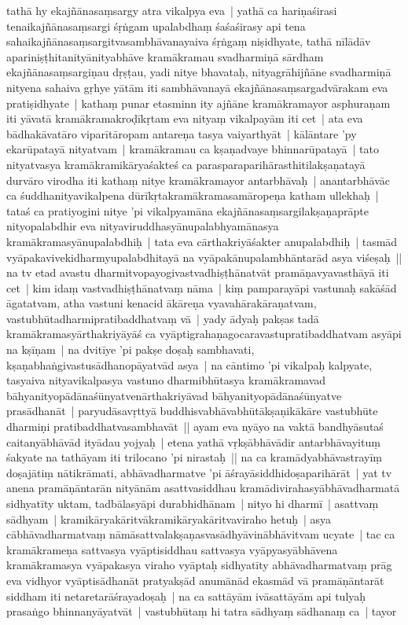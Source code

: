 \documentclass[article,12pt,a4paper]{memoir}%
\newcommand{\persName}[1]{#1}
\begin{document}
	  
	  \pstart \leavevmode%
	\label{thakur75-92.10}tathā hy ekajñānasaṃsargy atra vikalpya eva | yathā ca hariṇaśirasi tenaikajñānasaṃsargi śṛṅgam upalabdhaṃ śaśaśirasy api tena sahaikajñānasaṃsargitvasambhāvanayaiva śṛṅgaṃ niṣidhyate, tathā nīlādāv apariniṣṭhitanityānityabhāve kramākramau svadharmiṇā sārdham ekajñānasaṃsargiṇau dṛṣṭau, yadi nitye bhavataḥ, nityagrāhijñāne svadharmiṇā nityena sahaiva gṛhye yātām iti sambhāvanayā ekajñānasaṃsargadvārakam eva pratiṣidhyate | kathaṃ punar etasminn ity ajñāne kramākramayor asphuraṇam iti yāvatā kramākramakroḍīkṛtam eva nityaṃ vikalpayām iti cet | ata eva bādhakāvatāro viparītāropam antareṇa tasya vaiyarthyāt | \label{thakur75-92.17} kālāntare 'py ekarūpatayā nityatvam | kramākramau ca kṣaṇadvaye bhinnarūpatayā | tato nityatvasya kramākramikāryaśakteś ca parasparaparihārasthitilakṣaṇatayā durvāro virodha iti kathaṃ nitye kramākramayor antarbhāvaḥ | anantarbhāvāc ca śuddhanityavikalpena dūrīkṛtakramākramasamāropeṇa katham ullekhaḥ | tataś ca pratiyogini nitye 'pi vikalpyamāna ekajñānasaṃsargilakṣaṇaprāpte nityopalabdhir eva nityaviruddhasyānupalabhyamānasya kramākramasyānupalabdhiḥ | tata eva cārthakriyāśakter anupalabdhiḥ | tasmād vyāpakavivekidharmyupalabdhitayā na vyāpakānupalambhāntarād asya viśeṣaḥ || \label{thakur75-92.25} na tv etad avastu dharmitvopayogivastvadhiṣṭhānatvāt pramāṇavyavasthāyā iti cet | kim idaṃ vastvadhiṣṭhānatvaṃ nāma | kiṃ pamparayāpi vastunaḥ sakāśād āgatatvam, atha vastuni kenacid ākāreṇa vyavahārakāraṇatvam, vastubhūtadharmipratibaddhatvaṃ vā | \label{thakur75-93.1} yady ādyaḥ pakṣas tadā kramākramasyārthakriyāyāś ca vyāptigrahaṇagocaravastupratibaddhatvam asyāpi na kṣīṇam | \label{thakur75-93.2} na dvitīye 'pi pakṣe doṣaḥ sambhavati, kṣaṇabhaṅgivastusādhanopāyatvād asya | \label{thakur75-93.3} na cāntimo 'pi vikalpaḥ kalpyate, tasyaiva nityavikalpasya vastuno dharmibhūtasya kramākramavad bāhyanityopādānaśūnyatvenārthakriyāvad bāhyanityopādānaśūnyatve prasādhanāt | paryudāsavṛttyā buddhisvabhāvabhūtākṣaṇikākāre vastubhūte dharmiṇi pratibaddhatvasambhavāt || \label{thakur75-93.7} ayam eva nyāyo na vaktā bandhyāsutaś caitanyābhāvād ityādau yojyaḥ | etena yathā vṛkṣābhāvādir antarbhāvayituṃ śakyate na tathāyam iti \persName{trilocano} 'pi nirastaḥ || \label{thakur75-93.10} na ca kramādyabhāvastrayīṃ doṣajātiṃ nātikrāmati, abhāvadharmatve 'pi āśrayāsiddhidoṣaparihārāt | \label{thakur75-93.11} yat tv anena pramāṇāntarān nityānām asattvasiddhau kramādivirahasyābhāvadharmatā sidhyatīty uktam, tadbālasyāpi durabhidhānam | nityo hi dharmī | asattvaṃ sādhyam | kramikāryakāritvākramikāryakāritvaviraho hetuḥ | asya cābhāvadharmatvaṃ nāmāsattvalakṣaṇasvasādhyāvinābhāvitvam ucyate | tac ca kramākrameṇa sattvasya vyāptisiddhau sattvasya vyāpyasyābhāvena kramākramasya vyāpakasya viraho vyāptaḥ sidhyatīty abhāvadharmatvaṃ prāg eva vidhyor vyāptisādhanāt pratyakṣād anumānād ekasmād vā pramāṇāntarāt siddham iti netaretarāśrayadoṣaḥ | \label{thakur75-93.18} na ca sattāyām ivāsattāyām api tulyaḥ prasaṅgo bhinnanyāyatvāt | vastubhūtaṃ hi tatra sādhyaṃ sādhanaṃ ca | tayor 
\end{document}
